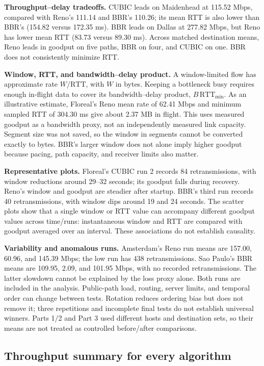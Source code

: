 \documentclass[11pt,letterpaper]{article}
\begin{document}
\textbf{Throughput--delay tradeoffs.}
CUBIC leads on Maidenhead at 115.52 Mbps, compared with Reno's 111.14 and BBR's
110.26; its mean RTT is also lower than BBR's (154.82 versus 172.35 ms).
BBR leads on Dallas at 277.82 Mbps, but Reno has lower mean RTT (83.73 versus
89.30 ms). Across matched destination means, Reno leads in goodput on five
paths, BBR on four, and CUBIC on one. BBR does not consistently minimize RTT.

\textbf{Window, RTT, and bandwidth--delay product.}
A window-limited flow has approximate rate $W/\mathrm{RTT}$, with $W$ in bytes.
Keeping a bottleneck busy requires enough in-flight data to cover its
bandwidth--delay product, $B\,\mathrm{RTT}_{\min}$. As an illustrative estimate,
Floreal's Reno mean rate of 62.41 Mbps and minimum sampled RTT of 304.30 ms give
about 2.37 MB in flight. This uses measured goodput as a bandwidth proxy, not
an independently measured link capacity. Segment size was not saved, so the
window in segments cannot be converted exactly to bytes. BBR's larger window
does not alone imply higher goodput because pacing, path capacity, and receiver
limits also matter.

\textbf{Representative plots.}
Floreal's CUBIC run 2 records 84 retransmissions, with window reductions around
29--32 seconds; its goodput falls during recovery. Reno's window and goodput
are steadier after startup. BBR's third run records 40 retransmissions, with
window dips around 19 and 24 seconds. The scatter plots show that a single
window or RTT value can accompany different goodput values across time/runs:
instantaneous window and RTT are compared with goodput averaged over an interval.
These associations do not establish causality.

\textbf{Variability and anomalous runs.}
Amsterdam's Reno run means are 157.00, 60.96, and 145.39 Mbps; the low run has
438 retransmissions. Sao Paulo's BBR means are 109.95, 2.09, and 101.95 Mbps,
with no recorded retransmissions. The latter slowdown cannot be explained by
the loss proxy alone. Both runs are included in the analysis. Public-path load, routing, server limits, and temporal order can
change between tests. Rotation reduces ordering bias but does not remove it;
three repetitions and incomplete final tests do not establish universal winners.
Parts 1/2 and Part 3 used different hosts and destination sets, so their means
are not treated as controlled before/after comparisons.


\clearpage

\clearpage\subsection{Throughput summary for every algorithm}
\end{document}
